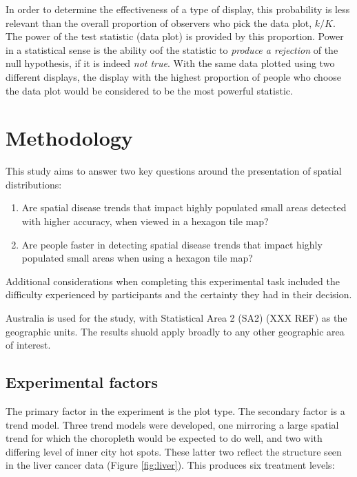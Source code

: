 \documentclass[conference,final,]{IEEEtran}
\providecommand{\tightlist}{%
  \setlength{\itemsep}{0pt}\setlength{\parskip}{0pt}}
\begin{document}
In order to determine the effectiveness of a type of display, this probability is less relevant than the overall proportion of observers who pick the data plot, \(k/K\). The power of the test statistic (data plot) is provided by this proportion. Power in a statistical sense is the ability oof the statistic to \emph{produce a rejection} of the null hypothesis, if it is indeed \emph{not true}. With the same data plotted using two different displays, the display with the highest proportion of people who choose the data plot would be considered to be the most powerful statistic.

\hypertarget{methodology}{%
\section{Methodology}\label{methodology}}

This study aims to answer two key questions around the presentation of spatial distributions:

\begin{enumerate}
\def\labelenumi{\arabic{enumi}.}
\tightlist
\item
  Are spatial disease trends that impact highly populated small areas detected with higher accuracy, when viewed in a hexagon tile map?
\item
  Are people faster in detecting spatial disease trends that impact highly populated small areas when using a hexagon tile map?
\end{enumerate}

Additional considerations when completing this experimental task included the difficulty experienced by participants and the certainty they had in their decision.

Australia is used for the study, with Statistical Area 2 (SA2) (XXX REF) as the geographic units. The results shuold apply broadly to any other geographic area of interest.

\hypertarget{experimental-factors}{%
\subsection{Experimental factors}\label{experimental-factors}}

The primary factor in the experiment is the plot type. The secondary factor is a trend model. Three trend models were developed, one mirroring a large spatial trend for which the choropleth would be expected to do well, and two with differing level of inner city hot spots. These latter two reflect the structure seen in the liver cancer data (Figure \ref{fig:liver}). This produces six treatment levels:
\end{document}
